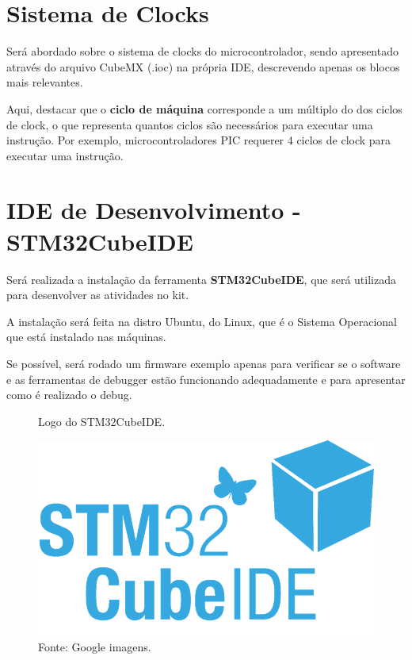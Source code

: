 \documentclass[12pt,a4paper]{report}
\begin{document}
\section{Sistema de Clocks}

Será abordado sobre o sistema de clocks do microcontrolador, sendo apresentado através do arquivo CubeMX (.ioc) na própria IDE, descrevendo apenas os blocos mais relevantes.

Aqui, destacar que o \textbf{ciclo de máquina} corresponde a um múltiplo do dos ciclos de clock, o que representa quantos ciclos são necessários para executar uma instrução. Por exemplo, microcontroladores PIC requerer 4 ciclos de clock para executar uma instrução.

\section{IDE de Desenvolvimento - STM32CubeIDE}

Será realizada a instalação da ferramenta \textbf{STM32CubeIDE}, que será utilizada para desenvolver as atividades no kit. 

A instalação será feita na distro Ubuntu, do Linux, que é o Sistema Operacional que está instalado nas máquinas.

Se possível, será rodado um firmware exemplo apenas para verificar se o software e as ferramentas de debugger estão funcionando adequadamente e para apresentar como é realizado o debug.

\begin{figure}[H]
    \begin{center}
    \caption{Logo do STM32CubeIDE.}		%
    \includegraphics[scale=0.6]{fig/stm32cubeide.png}
    \caption*{Fonte: Google imagens.}
    \label{fig:stm32cubeide}
    \end{center}
\end{figure}
\end{document}

